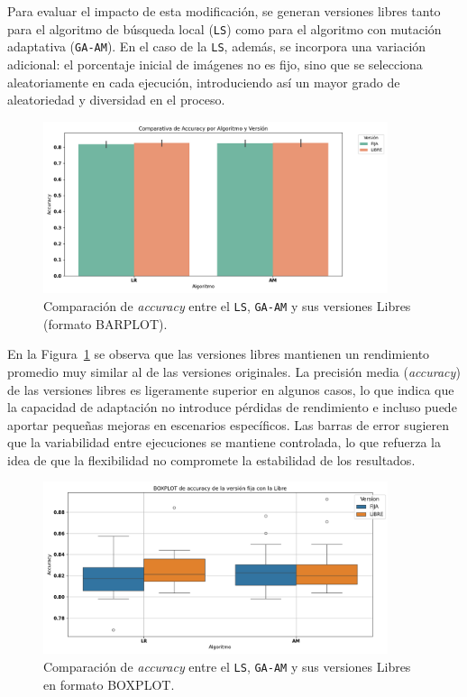 Para evaluar el impacto de esta modificación, se generan versiones libres tanto para el algoritmo de búsqueda local (\texttt{LS})
como para el algoritmo con mutación adaptativa (\texttt{GA-AM}).
En el caso de la \texttt{LS}, además, se incorpora una variación adicional: el porcentaje inicial de imágenes no es fijo,
sino que se selecciona aleatoriamente en cada ejecución, introduciendo así un mayor grado de aleatoriedad y diversidad en el proceso.


\begin{figure}[htp]
    \centering
    \includegraphics[width=0.9\textwidth]{imagenes/evaluaciones/libres/barplot_por_algoritmo}
    \caption{Comparación de \textit{accuracy} entre el \texttt{LS}, \texttt{GA-AM} y sus versiones Libres (formato BARPLOT).}
    \label{fig:barplot_por_algoritmo-libres}
\end{figure}

En la Figura~\ref{fig:barplot_por_algoritmo-libres} se observa que las versiones libres mantienen un rendimiento promedio muy similar al de las versiones originales.
La precisión media (\textit{accuracy}) de las versiones libres es ligeramente superior en algunos casos,
lo que indica que la capacidad de adaptación no introduce pérdidas de rendimiento e incluso puede aportar pequeñas mejoras en escenarios específicos.
Las barras de error sugieren que la variabilidad entre ejecuciones se mantiene controlada,
lo que refuerza la idea de que la flexibilidad no compromete la estabilidad de los resultados.


\begin{figure}[htp]
    \centering
    \includegraphics[width=0.9\textwidth]{imagenes/evaluaciones/libres/boxplot_por_algoritmo}
    \caption{Comparación de \textit{accuracy} entre el \texttt{LS}, \texttt{GA-AM} y sus versiones Libres en formato BOXPLOT.}
    \label{fig:boxplot_por_algoritmo-libres}
\end{figure}

